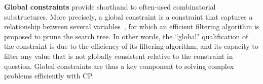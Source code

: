 \textbf{Global constraints} provide shorthand to often-used combinatorial substructures. More precisely, a global constraint is a constraint that captures a relationship between several variables~\cite{beldiceanu2010global, HoeveK06}, for which an efficient filtering algorithm is proposed to prune the search tree. In other words, the ``global" qualification of the constraint is due to the efficiency of its filtering algorithm, and its capacity to filter any value that is not globally consistent relative to the constraint in question.
Global constraints are thus a key component to solving complex problems efficiently with CP.
